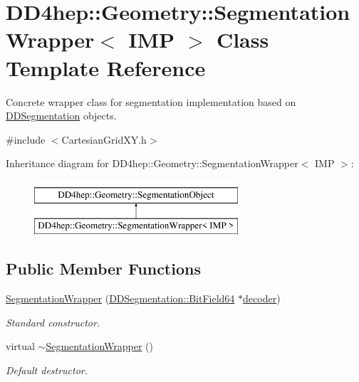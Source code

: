 \hypertarget{class_d_d4hep_1_1_geometry_1_1_segmentation_wrapper}{}\section{D\+D4hep\+:\+:Geometry\+:\+:Segmentation\+Wrapper$<$ I\+MP $>$ Class Template Reference}
\label{class_d_d4hep_1_1_geometry_1_1_segmentation_wrapper}


Concrete wrapper class for segmentation implementation based on \hyperlink{namespace_d_d4hep_1_1_d_d_segmentation}{D\+D\+Segmentation} objects.  




{\ttfamily \#include $<$Cartesian\+Grid\+X\+Y.\+h$>$}

Inheritance diagram for D\+D4hep\+:\+:Geometry\+:\+:Segmentation\+Wrapper$<$ I\+MP $>$\+:\begin{figure}[H]
\begin{center}
\leavevmode
\includegraphics[height=2.000000cm]{class_d_d4hep_1_1_geometry_1_1_segmentation_wrapper}
\end{center}
\end{figure}
\subsection*{Public Member Functions}
\begin{DoxyCompactItemize}
\item 
\hyperlink{class_d_d4hep_1_1_geometry_1_1_segmentation_wrapper_a422a008dd4769304777684a719f5801f}{Segmentation\+Wrapper} (\hyperlink{class_d_d4hep_1_1_d_d_segmentation_1_1_bit_field64}{D\+D\+Segmentation\+::\+Bit\+Field64} $\ast$\hyperlink{class_d_d4hep_1_1_geometry_1_1_segmentation_object_abc372258e19cc674c4836de96cc894e1}{decoder})
\begin{DoxyCompactList}\small\item\em Standard constructor. \end{DoxyCompactList}\item 
virtual \hyperlink{class_d_d4hep_1_1_geometry_1_1_segmentation_wrapper_a0fe7f6d55cdf27640ee18c8606b659b2}{$\sim$\+Segmentation\+Wrapper} ()
\begin{DoxyCompactList}\small\item\em Default destructor. \end{DoxyCompactList}\end{DoxyCompactItemize}
